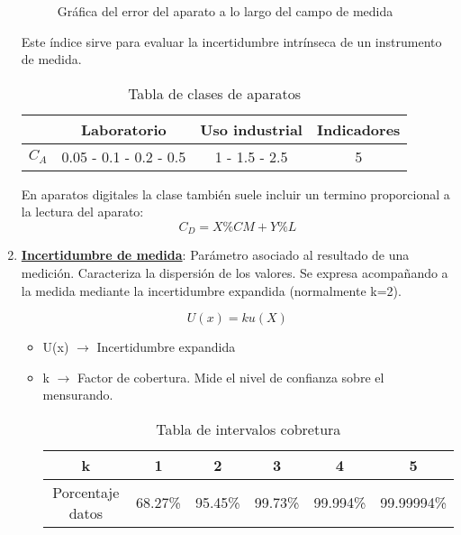 \begin{enumerate}
\begin{figure}[H]
\begin{tikzpicture}[scale=0.7]
		\end{tikzpicture}
		\caption{Gráfica del error del aparato a lo largo del campo de medida}
		\label{fig:graph-1-over-x}
	\end{figure}

	Este índice sirve para evaluar la incertidumbre intrínseca de un instrumento de medida.
	\renewcommand{\arraystretch}{1.1} %
	\begin{table}[htb]
		\centering
		\begin{tabular}{|c|c|c|c|}
			\hline
			{} &\textbf{Laboratorio} & \textbf{Uso industrial} & \textbf{Indicadores} \\
			
			\hline
			$C_A$ & 0.05 - 0.1 - 0.2 - 0.5 & 1 - 1.5 - 2.5 & 5 \\
			\hline
		\end{tabular}
		\caption{Tabla de clases de aparatos}
		\label{tab:your-table-label}
	\end{table}
	
	En aparatos digitales la clase también suele incluir un termino proporcional a la lectura del aparato:
	\[C_D= X\% CM + Y\% L \]
	
	\item \underline{\textbf{Incertidumbre de medida}}: Parámetro asociado al resultado de una medición. Caracteriza la dispersión de los valores. Se expresa acompañando a la medida mediante la incertidumbre expandida (normalmente k=2).
	
	\[U(x) = k u(X) \]
	\begin{itemize}
		\item U(x) $\rightarrow$ Incertidumbre expandida
		\item k $\rightarrow$ Factor de cobertura. Mide el nivel de confianza sobre el mensurando.
		
		\renewcommand{\arraystretch}{1.1} %
		\begin{table}[htb]
			\centering
			\begin{tabular}{|c|c|c|c|c|c|}
				\hline
				{k} &\textbf{1} & \textbf{2} & \textbf{3}  & \textbf{4}& \textbf{5} \\
				
				\hline
				Porcentaje datos&68.27\% & 95.45\% & 99.73\% & 99.994\% & 99.99994\% \\
				
				\hline
			\end{tabular}
			\caption{Tabla de intervalos cobretura}
			\label{tab:your-table-label}
		\end{table}
		

\end{itemize}
\end{enumerate}
